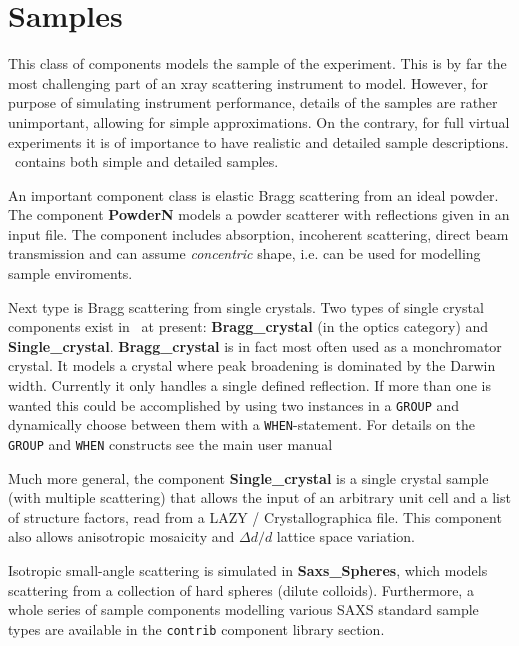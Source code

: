 \chapter{Samples}
\label{c:samples}

This class of components models the sample of the experiment.
This is by far the most challenging part of an xray scattering
instrument to model. However, for purpose of simulating
instrument performance, details of the samples are rather unimportant,
allowing for simple approximations. On the contrary, for full
virtual experiments it is of importance to have realistic and
detailed sample descriptions. \MCX\ contains both simple and detailed
samples.

An important component class is elastic Bragg scattering from an ideal powder.
The component \textbf{PowderN} models a powder scatterer with reflections
given in an input file. 
The component includes absorption, incoherent scattering, direct beam
transmission and can assume \emph{concentric} shape, i.e. can be used
for modelling sample enviroments.

Next type is Bragg scattering from single crystals. Two types of single crystal
components exist in \MCX\ at present: \textbf{Bragg\_crystal} (in the optics
category) and \textbf{Single\_crystal}.
\textbf{Bragg\_crystal} is in fact most often used as a monchromator crystal. It models a 
crystal where peak broadening is dominated by the Darwin width. Currently it only handles a
single defined reflection. If more than one is wanted this could be
accomplished by using two instances in a \texttt{GROUP} and dynamically choose between
them with a \texttt{WHEN}-statement. For details on the \texttt{GROUP} and \texttt{WHEN} constructs see the
main \MCX user manual~\cite{mcxtracemanual}

Much more general, the component \textbf{Single\_crystal}
is a single crystal sample (with multiple scattering) that allows
the input of an arbitrary unit cell and a list of structure factors, read
from a LAZY / Crystallographica file.
This component also allows anisotropic mosaicity
and $\Delta d/d$ lattice space variation.

Isotropic small-angle scattering is simulated in \textbf{Saxs\_Spheres},
which models scattering from a collection of hard spheres (dilute colloids).
Furthermore, a whole series of sample components modelling various SAXS standard 
sample types are available in the  \texttt{contrib} component library section.

